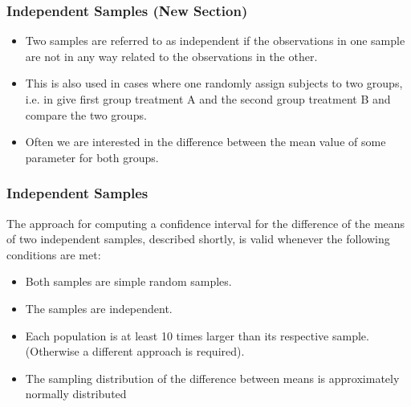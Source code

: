 \documentclass[a4]{beamer}
\begin{document}
\begin{frame}
\frametitle{Independent Samples (New Section)}
\begin{itemize}
\item Two samples are referred to as independent if the observations in one sample are not in any way related to the observations in the other. \item This is also used in cases where one randomly assign subjects to two groups, i.e. in give first group treatment A and the second group treatment B and compare the two groups.
\item Often we are interested in the difference between the mean value of some parameter for both groups.
\end{itemize}
\end{frame}

\begin{frame}
\frametitle{Independent Samples}

The approach for computing a confidence interval for the difference of the means of two independent samples,  described shortly, is valid whenever the following conditions are met:

\begin{itemize}
\item Both samples are simple random samples.
\item The samples are independent.
\item Each population is at least 10 times larger than its respective sample. (Otherwise a different approach is required).
\item The sampling distribution of the difference between means is approximately normally distributed
\end{itemize}

\end{frame}
\end{document}
